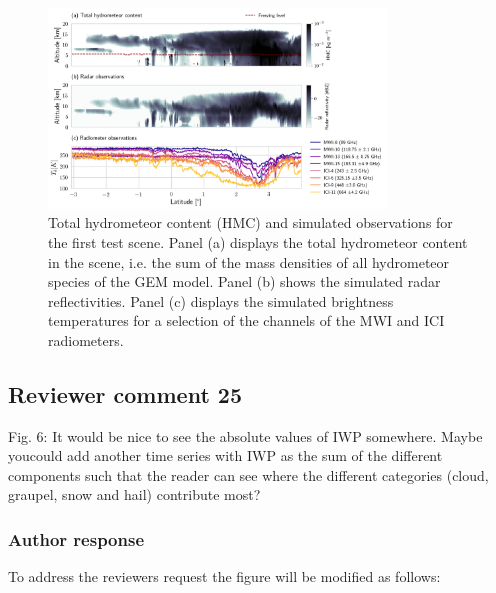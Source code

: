 \documentclass[11pt]{scrartcl}
\begin{document}
\begin{figure}
\centering
\includegraphics[width = 0.8\textwidth]{../plots/observations_a.png}
\caption{Total hydrometeor content (HMC) and simulated observations for the first test
  scene. Panel (a) displays the total hydrometeor content in the scene, i.e. the
  sum of the mass densities of all hydrometeor species of the GEM model. Panel
  (b) shows the simulated radar reflectivities. Panel (c) displays the simulated
  brightness temperatures for a selection of the channels of the MWI and ICI
  radiometers.}
\label{fig:observations_a}
\end{figure}


\subsection*{Reviewer comment 25}
Fig.  6:  It would be nice to see the absolute values of IWP somewhere.  Maybe youcould add another time series with IWP as the sum of the different components such that the reader can see where the different categories (cloud, graupel, snow and hail) contribute most?

\subsubsection*{Author response}

To address the reviewers request the figure will be modified as follows:
\end{document}
